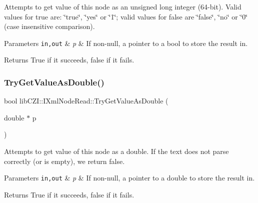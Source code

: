 Attempts to get value of this node as an unsigned long integer (64-\/bit). Valid values for true are\+: \char`\"{}true\char`\"{}, \char`\"{}yes\char`\"{} or \char`\"{}1\char`\"{}; valid values for false are \char`\"{}false\char`\"{}, \char`\"{}no\char`\"{} or \char`\"{}0\char`\"{} (case insensitive comparison). 
\begin{DoxyParams}[1]{Parameters}
\mbox{\tt in,out}  & {\em p} & If non-\/null, a pointer to a bool to store the result in. \\
\hline
\end{DoxyParams}
\begin{DoxyReturn}{Returns}
True if it succeeds, false if it fails. 
\end{DoxyReturn}
\mbox{\label{classlib_c_z_i_1_1_i_xml_node_read_a3bb9226ebe823d70968e694407f90bc7}} 
\subsubsection{\texorpdfstring{Try\+Get\+Value\+As\+Double()}{TryGetValueAsDouble()}}
{\footnotesize\ttfamily bool lib\+C\+Z\+I\+::\+I\+Xml\+Node\+Read\+::\+Try\+Get\+Value\+As\+Double (\begin{DoxyParamCaption}\item[{double $\ast$}]{p }\end{DoxyParamCaption})}

Attempts to get value of this node as a double. If the text does not parse correctly (or is empty), we return false. 
\begin{DoxyParams}[1]{Parameters}
\mbox{\tt in,out}  & {\em p} & If non-\/null, a pointer to a double to store the result in. \\
\hline
\end{DoxyParams}
\begin{DoxyReturn}{Returns}
True if it succeeds, false if it fails. 
\end{DoxyReturn}
\mbox{\label{classlib_c_z_i_1_1_i_xml_node_read_af3070ab11416f7658e198d8cd89210c0}} 
